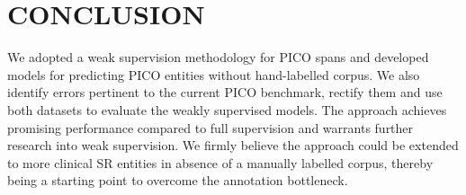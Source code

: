 \documentclass[10.7pt,]{article}
\begin{document}
\section{CONCLUSION}\label{conclusion}
%
We adopted a weak supervision methodology for PICO spans and developed models for predicting PICO entities without hand-labelled corpus.
We also identify errors pertinent to the current PICO benchmark, rectify them and use both datasets to evaluate the weakly supervised models.
The approach achieves promising performance compared to full supervision and warrants further research into weak supervision.
We firmly believe the approach could be extended to more clinical SR entities in absence of a manually labelled corpus, thereby being a starting point to overcome the annotation bottleneck.
%
%
%
%
%
%
%
%
%
%
%


\end{document}
